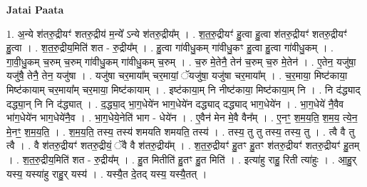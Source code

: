 \documentclass[17pt]{extarticle}
\begin{document}
\textbf{Jatai Paata} \newline

1. अ॒न्ये श॑तरु॒द्रीयꣳ॑ शतरु॒द्रीय॑ म॒न्ये᳚ ऽन्ये श॑तरु॒द्रीय᳚म् । . श॒त॒रु॒द्रीयꣳ॑ हु॒त्वा हु॒त्वा श॑तरु॒द्रीयꣳ॑ शतरु॒द्रीयꣳ॑ हु॒त्वा । . श॒त॒रु॒द्रीय॒मिति॑ शत - रु॒द्रीय᳚म् । . हु॒त्वा गा॑वीधु॒कम् गा॑वीधु॒कꣳ हु॒त्वा हु॒त्वा गा॑वीधु॒कम् । . गा॒वी॒धु॒कम् च॒रुम् च॒रुम् गा॑वीधु॒कम् गा॑वीधु॒कम् च॒रुम् । . च॒रु मे॒तेनै॒ तेन॑ च॒रुम् च॒रु मे॒तेन॑ । . ए॒तेन॒ यजु॑षा॒ यजु॑षै॒ तेनै॒ तेन॒ यजु॑षा । . यजु॑षा चर॒माया᳚म् चर॒मायां॒ ॅयजु॑षा॒ यजु॑षा चर॒माया᳚म् । . च॒र॒माया॒ मिष्ट॑काया॒ मिष्ट॑कायाम् चर॒माया᳚म् चर॒माया॒ मिष्ट॑कायाम् । . इष्ट॑काया॒म् नि नीष्ट॑काया॒ मिष्ट॑काया॒म् नि । . नि द॑द्ध्याद् दद्ध्या॒न् नि नि द॑द्ध्यात् । . द॒द्ध्या॒द् भा॒ग॒धेये॑न भाग॒धेये॑न दद्ध्याद् दद्ध्याद् भाग॒धेये॑न । . भा॒ग॒धेये॑ नै॒वैव भा॑ग॒धेये॑न भाग॒धेये॑नै॒व । . भा॒ग॒धेये॒नेति॑ भाग - धेये॑न । . ए॒वैन॑ मेन मे॒वै वैन᳚म् । . ए॒नꣳ॒॒ श॒म॒य॒ति॒ श॒म॒य॒ त्ये॒न॒ मे॒नꣳ॒॒ श॒म॒य॒ति॒ । . श॒म॒य॒ति॒ तस्य॒ तस्य॑ शमयति शमयति॒ तस्य॑ । . तस्य॒ तु तु तस्य॒ तस्य॒ तु । . त्वै वै तु त्वै । . वै श॑तरु॒द्रीयꣳ॑ शतरु॒द्रीयं॒ ॅवै वै श॑तरु॒द्रीय᳚म् । . श॒त॒रु॒द्रीयꣳ॑ हु॒तꣳ हु॒तꣳ श॑तरु॒द्रीयꣳ॑ शतरु॒द्रीयꣳ॑ हु॒तम् । . श॒त॒रु॒द्रीय॒मिति॑ शत - रु॒द्रीय᳚म् । . हु॒त मितीति॑ हु॒तꣳ हु॒त मिति॑ । . इत्या॑हु राहु॒ रिती त्या॑हुः । . आ॒हु॒र् यस्य॒ यस्या॑हु राहु॒र् यस्य॑ । . यस्यै॒त दे॒तद् यस्य॒ यस्यै॒तत् । \newline
\end{document}
